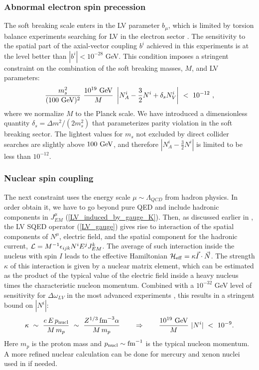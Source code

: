 \documentclass[12pt]{revtex4}
\begin{document}
\subsubsection*{Abnormal electron spin precession}


The soft  breaking scale enters in the LV parameter $b_\mu$, which is 
limited by torsion balance experiments searching for LV in the
electron sector \cite{Heckel:1999sy}. The sensitivity to the spatial
part of the axial-vector  
coupling $b^i$ achieved in this experiments is at the level better
than $|b^i| < 10^{-28}$ GeV. This condition imposes a stringent
constraint on the combination of the soft breaking masses, 
$M$, and LV parameters:
%
\begin{equation}
\frac{m_{s}^2}{(100~{\rm GeV})^2}~
\frac {10^{19}~{\rm GeV}}{M} ~ 
\left| N_A^i - \frac{3}{2} N^i + \delta_{s} N_V^i \right |
~<~10^{-12}~, 
\label{b_limit}
\end{equation}
%
where we normalize $M$ to the Planck scale. We have introduced a
dimensionless quantity  
$\delta_s = \Delta m^2/(2m_s^2)$ that parameterizes parity violation
in the soft breaking sector. The lightest values for $m_s$ not
excluded by direct collider searches are slightly above 
$100~{\rm GeV}$, and therefore $|N_A^i - \frac{3}{2} N^i |$ is limited
to be less than $10^{-12}$.  


\subsubsection*{Nuclear spin coupling}


The next constraint uses the energy scale $\mu \sim \Lambda_{QCD}$ from
hadron physics. In order obtain it, we have to go beyond pure QED and
include hadronic components in $J^\mu_{EM}$
(\ref{LV_induced_by_gauge_K}). Then, as discussed earlier in  
\cite{GrootNibbelink:2004za}, the LV SQED operator (\ref{LV_gauge})
gives rise to interaction of the spatial components of $N^\mu$,
electric field, and the spatial component  
for the hadronic current, ${\cal L} = M^{-1}\epsilon_{ijk} N^i E^j J_{EM}^k$.
The average of such interaction inside the nucleus with spin $I$ leads to 
the effective Hamiltonian 
$\mathcal{H}_{\rm eff}= \kappa \vec I\cdot \vec N$.
The strength $\kappa$ of this interaction is given by a nuclear matrix
element, which can be estimated as the product of the typical value of 
the electric field inside a heavy nucleus times the characteristic  
nucleon momentum. Combined with a $10^{-32}$ GeV level of sensitivity
for  $\Delta \omega_{LV}$ in the most advanced experiments
\cite{clock1,clock2}, this results in a stringent bound on $|N^i|$:
%
\begin{equation}
\kappa ~\sim~ \frac{e\, E \, p_{\rm nucl}}{M\, m_p} 
~\sim~ \frac{Z^{1/3}\, {\rm fm}^{-3}\alpha}{M \,m_p} 
\qquad \Rightarrow \qquad
\frac {10^{19}~{\rm GeV}}{M} ~ |N^i| ~<~ 10^{-9}.
\label{N_limit_nucl}
\end{equation}
%
Here $m_p$ is the proton mass and $p_{\rm nucl}\sim {\rm fm}^{-1}$ is
the typical nucleon momentum. A more refined nuclear calculation can
be done for mercury and xenon nuclei used in \cite{clock1,clock2} if needed.
\end{document}
